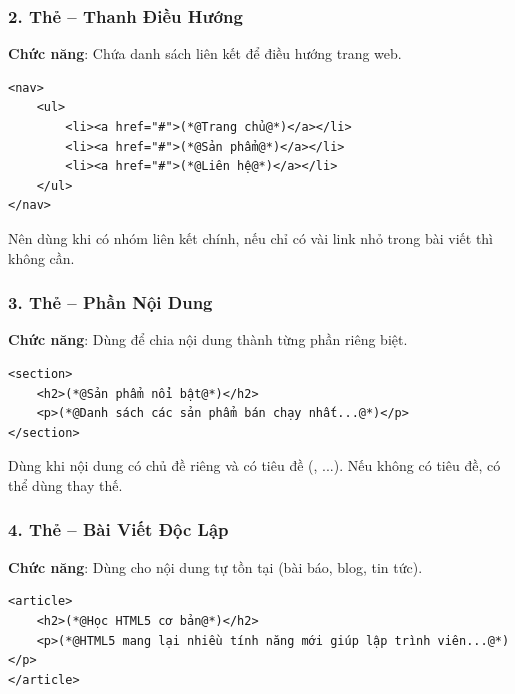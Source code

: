 \subsubsection{2. Thẻ  -- Thanh Điều Hướng}
\textbf{Chức năng}: Chứa danh sách liên kết để điều hướng trang web.

\begin{codeWindow}
\begin{lstlisting}[language=HTML5]
<nav>
    <ul>
        <li><a href="#">(*@Trang chủ@*)</a></li>
        <li><a href="#">(*@Sản phẩm@*)</a></li>
        <li><a href="#">(*@Liên hệ@*)</a></li>
    </ul>
</nav>
\end{lstlisting}
\end{codeWindow}

\begin{noteBox}
Nên dùng  khi có nhóm liên kết chính, nếu chỉ có vài link nhỏ trong bài viết thì không cần.
\end{noteBox}

\subsubsection{3. Thẻ  -- Phần Nội Dung}
\textbf{Chức năng}: Dùng để chia nội dung thành từng phần riêng biệt.

\begin{codeWindow}
\begin{lstlisting}[language=HTML5]
<section>
    <h2>(*@Sản phẩm nổi bật@*)</h2>
    <p>(*@Danh sách các sản phẩm bán chạy nhất...@*)</p>
</section>
\end{lstlisting}
\end{codeWindow}

\begin{noteBox}
Dùng  khi nội dung có chủ đề riêng và có tiêu đề (, ...). Nếu không có tiêu đề, có thể dùng  thay thế.
\end{noteBox}

\subsubsection{4. Thẻ  -- Bài Viết Độc Lập}
\textbf{Chức năng}: Dùng cho nội dung tự tồn tại (bài báo, blog, tin tức).

\begin{codeWindow}
\begin{lstlisting}[language=HTML5]
<article>
    <h2>(*@Học HTML5 cơ bản@*)</h2>
    <p>(*@HTML5 mang lại nhiều tính năng mới giúp lập trình viên...@*)</p>
</article>
\end{lstlisting}
\end{codeWindow}

